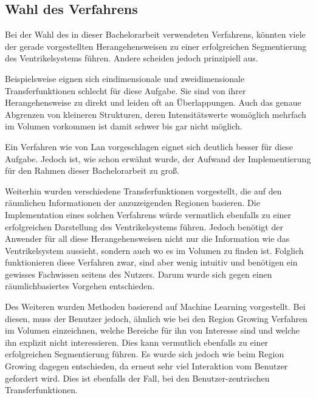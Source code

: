 \subsection{Wahl des Verfahrens}


Bei der Wahl des in dieser Bachelorarbeit verwendeten Verfahrens, könnten viele der gerade vorgestellten Herangehensweisen zu einer erfolgreichen Segmentierung des Ventrikelsystems führen. Andere scheiden jedoch prinzipiell aus.


Beispielsweise eignen sich eindimensionale und zweidimensionale Transferfunktionen schlecht für diese Aufgabe. Sie sind von ihrer Herangehensweise zu direkt und leiden oft an Überlappungen. Auch das genaue Abgrenzen von kleineren Strukturen, deren Intensitätswerte womöglich mehrfach im Volumen vorkommen ist damit schwer bis gar nicht möglich.


Ein Verfahren wie von Lan \cite{lan2017improving} vorgeschlagen eignet sich deutlich besser für diese Aufgabe. Jedoch ist, wie schon erwähnt wurde, der Aufwand der Implementierung für den Rahmen dieser Bachelorarbeit zu groß.


Weiterhin wurden verschiedene Transferfunktionen vorgestellt, die auf den räumlichen Informationen der anzuzeigenden Regionen basieren. Die Implementation eines solchen Verfahrens würde vermutlich ebenfalls zu einer erfolgreichen Darstellung des Ventrikelsystems führen.
\newline
Jedoch benötigt der Anwender für all diese Herangehensweisen nicht nur die Information wie das Ventrikelsystem aussieht, sondern auch wo es im Volumen zu finden ist. Folglich funktionieren diese Verfahren zwar, sind aber wenig intuitiv und benötigen ein gewisses Fachwissen seitens des Nutzers. Darum wurde sich gegen einen räumlichbasiertes Vorgehen entschieden.


Des Weiteren wurden Methoden basierend auf Machine Learning vorgestellt. Bei diesen, muss der Benutzer jedoch, ähnlich wie bei den Region Growing Verfahren im Volumen einzeichnen, welche Bereiche für ihn von Interesse sind und welche ihn explizit nicht interessieren.
Dies kann vermutlich ebenfalls zu einer erfolgreichen Segmentierung führen. Es wurde sich jedoch wie beim Region Growing dagegen entschieden, da erneut sehr viel Interaktion vom Benutzer gefordert wird.
Dies ist ebenfalls der Fall, bei den Benutzer-zentrischen Transferfunktionen.


